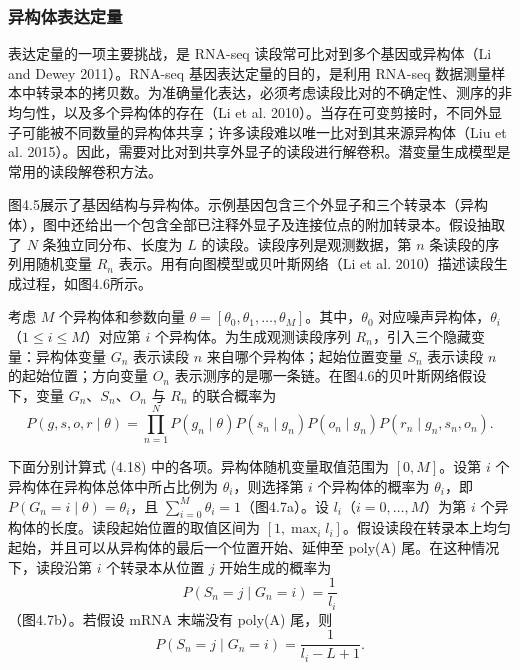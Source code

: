 \subsubsection{异构体表达定量}

表达定量的一项主要挑战，是 RNA-seq 读段常可比对到多个基因或异构体（Li and Dewey 2011）。RNA-seq 基因表达定量的目的，是利用 RNA-seq 数据测量样本中转录本的拷贝数。为准确量化表达，必须考虑读段比对的不确定性、测序的非均匀性，以及多个异构体的存在（Li et al. 2010）。当存在可变剪接时，不同外显子可能被不同数量的异构体共享；许多读段难以唯一比对到其来源异构体（Liu et al. 2015）。因此，需要对比对到共享外显子的读段进行解卷积。潜变量生成模型是常用的读段解卷积方法。

图4.5展示了基因结构与异构体。示例基因包含三个外显子和三个转录本（异构体），图中还给出一个包含全部已注释外显子及连接位点的附加转录本。假设抽取了 $N$ 条独立同分布、长度为 $L$ 的读段。读段序列是观测数据，第 $n$ 条读段的序列用随机变量 $R_n$ 表示。用有向图模型或贝叶斯网络（Li et al. 2010）描述读段生成过程，如图4.6所示。




考虑 $M$ 个异构体和参数向量 $\theta=[\theta_0,\theta_1,\ldots,\theta_M]$。其中，$\theta_0$ 对应噪声异构体，$\theta_i$（$1\le i\le M$）对应第 $i$ 个异构体。为生成观测读段序列 $R_n$，引入三个隐藏变量：异构体变量 $G_n$ 表示读段 $n$ 来自哪个异构体；起始位置变量 $S_n$ 表示读段 $n$ 的起始位置；方向变量 $O_n$ 表示测序的是哪一条链。在图4.6的贝叶斯网络假设下，变量 $G_n$、$S_n$、$O_n$ 与 $R_n$ 的联合概率为
\begin{equation}
P(g,s,o,r\mid\theta)=\prod_{n=1}^{N}P(g_n\mid\theta)P(s_n\mid g_n)P(o_n\mid g_n)P(r_n\mid g_n,s_n,o_n).
\tag{4.18}
\end{equation}

下面分别计算式 (4.18) 中的各项。异构体随机变量取值范围为 $[0,M]$。设第 $i$ 个异构体在异构体总体中所占比例为 $\theta_i$，则选择第 $i$ 个异构体的概率为 $\theta_i$，即 $P(G_n=i\mid\theta)=\theta_i$，且 $\sum_{i=0}^{M}\theta_i=1$（图4.7a）。设 $l_i$（$i=0,\ldots,M$）为第 $i$ 个异构体的长度。读段起始位置的取值区间为 $[1,\max_i l_i]$。假设读段在转录本上均匀起始，并且可以从异构体的最后一个位置开始、延伸至 poly(A) 尾。在这种情况下，读段沿第 $i$ 个转录本从位置 $j$ 开始生成的概率为
\[
P(S_n=j\mid G_n=i)=\frac1{l_i}
\]
（图4.7b）。若假设 mRNA 末端没有 poly(A) 尾，则
\[
P(S_n=j\mid G_n=i)=\frac1{l_i-L+1}.
\]

